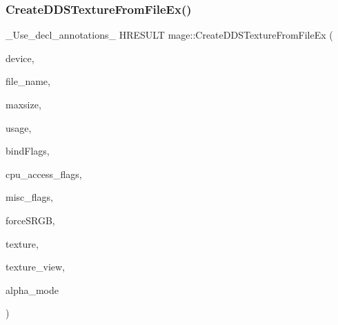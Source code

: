\subsubsection{\texorpdfstring{Create\+D\+D\+S\+Texture\+From\+File\+Ex()}{CreateDDSTextureFromFileEx()}\hspace{0.1cm}{\footnotesize\ttfamily [3/4]}}
{\footnotesize\ttfamily \+\_\+\+Use\+\_\+decl\+\_\+annotations\+\_\+ H\+R\+E\+S\+U\+LT mage\+::\+Create\+D\+D\+S\+Texture\+From\+File\+Ex (\begin{DoxyParamCaption}\item[{\hyperlink{namespacemage_ae74f374780900893caa5555d1031fd79}{Com\+Ptr}$<$ I\+D3\+D11\+Device2 $>$}]{device,  }\item[{const wchar\+\_\+t $\ast$}]{file\+\_\+name,  }\item[{size\+\_\+t}]{maxsize,  }\item[{D3\+D11\+\_\+\+U\+S\+A\+GE}]{usage,  }\item[{uint32\+\_\+t}]{bind\+Flags,  }\item[{uint32\+\_\+t}]{cpu\+\_\+access\+\_\+flags,  }\item[{uint32\+\_\+t}]{misc\+\_\+flags,  }\item[{bool}]{force\+S\+R\+GB,  }\item[{I\+D3\+D11\+Resource $\ast$$\ast$}]{texture,  }\item[{I\+D3\+D11\+Shader\+Resource\+View $\ast$$\ast$}]{texture\+\_\+view,  }\item[{\hyperlink{namespacemage_a0c586a2bad862f4858900ca121ca80c2}{D\+D\+S\+\_\+\+A\+L\+P\+H\+A\+\_\+\+M\+O\+DE} $\ast$}]{alpha\+\_\+mode }\end{DoxyParamCaption})}

\hypertarget{namespacemage_aa5397e65fcbb656f47ac0179ba94db1b}{}\label{namespacemage_aa5397e65fcbb656f47ac0179ba94db1b} 
